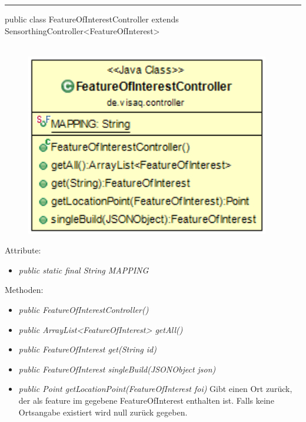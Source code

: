 \rule{\textwidth}{0.4pt}
public class FeatureOfInterestController extends SensorthingController<FeatureOfInterest>
\\\\
\begin{minipage}{0.4\textwidth}
    \begin{figure}[H]
        {\centering\includegraphics[width=0.95\textwidth]{media/backend/controller/classes/FeatureOfInterest.png}}
    \end{figure}
    \end{minipage} \hfill
\begin{minipage}{0.6\textwidth}
\end{minipage}

Attribute:
\begin{itemize}
    \item \emph{public static final String MAPPING} \mappingDescription
\end{itemize}
Methoden:
\begin{itemize}
    \item \emph{public FeatureOfInterestController()}
    \item \emph{public ArrayList<FeatureOfInterest> getAll()}
    \extendsSensorthingController
    \item \emph{public FeatureOfInterest get(String id)}
    \extendsSensorthingController
    \item \emph{public FeatureOfInterest singleBuild(JSONObject json)}
    \extendsSensorthingController
    \item \emph{public Point getLocationPoint(FeatureOfInterest foi)}
    Gibt einen Ort zurück, der als feature im gegebene FeatureOfInterest enthalten ist.
    Falls keine Ortsangabe existiert wird null zurück gegeben.
\end{itemize}

